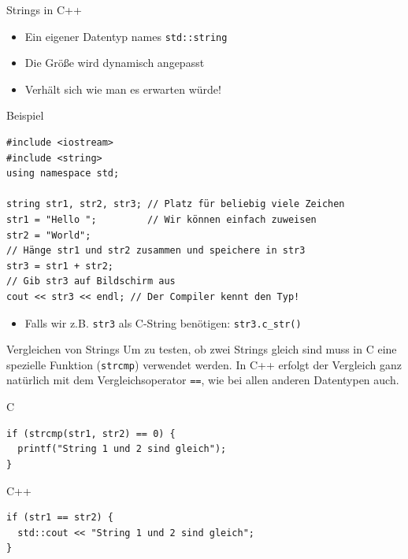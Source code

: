 \documentclass[presentation]{beamer}
\begin{document}
\begin{frame}[label={sec:org132888b},fragile]{Strings in C++}
 \begin{itemize}
\item Ein eigener Datentyp names {\color{solarizedYellow}\verb!std::string!}
\item Die Größe wird dynamisch angepasst
\item Verhält sich wie man es erwarten würde!
\end{itemize}
\begin{exampleblock}{Beispiel}
\begin{verbatim}
#include <iostream>
#include <string>
using namespace std;

string str1, str2, str3; // Platz für beliebig viele Zeichen
str1 = "Hello ";         // Wir können einfach zuweisen
str2 = "World";
// Hänge str1 und str2 zusammen und speichere in str3
str3 = str1 + str2;
// Gib str3 auf Bildschirm aus
cout << str3 << endl; // Der Compiler kennt den Typ!
\end{verbatim}
\end{exampleblock}
\begin{itemize}
\item Falls wir z.B. {\color{solarizedYellow}\verb!str3!} als C-String benötigen:  {\color{solarizedYellow}\verb!str3.c_str()!}
\end{itemize}
\end{frame}
\begin{frame}[label={sec:org7c6a322},fragile]{Vergleichen von Strings}
 Um zu testen, ob zwei Strings gleich sind muss in C eine spezielle
Funktion ({\color{solarizedYellow}\verb!strcmp!}) verwendet werden. In C++ erfolgt der Vergleich
ganz natürlich mit dem Vergleichsoperator {\color{solarizedYellow}\verb!==!}, wie bei allen anderen
Datentypen auch.
\begin{exampleblock}{C}
\begin{verbatim}
if (strcmp(str1, str2) == 0) {
  printf("String 1 und 2 sind gleich");
}
\end{verbatim}
\end{exampleblock}
\begin{exampleblock}{C++}
\begin{verbatim}
if (str1 == str2) {
  std::cout << "String 1 und 2 sind gleich";
}
\end{verbatim}
\end{exampleblock}
\end{frame}
\end{document}
